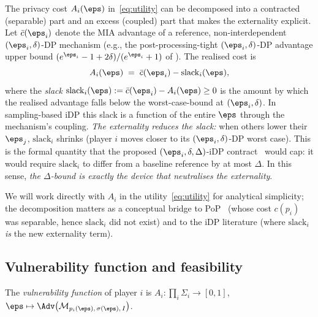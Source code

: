 The privacy cost $A_i(\boldsymbol{\eps})$ in~\eqref{eq:utility} can be
decomposed into a contracted (separable) part and an excess (coupled) part
that makes the externality explicit. Let $\bar c(\eps_i)$ denote the
MIA advantage of a reference, non-interdependent $(\eps_i, \delta)$-DP
mechanism (e.g., the post-processing-tight $(\eps_i,\delta)$-DP advantage
upper bound $(e^{\eps_i}-1+2\delta)/(e^{\eps_i}+1)$ of
\cite{hayes2024bullseye, kaissis2024beyond}). The realised cost is
\begin{equation}
A_i(\boldsymbol{\eps}) \;=\; \bar c(\eps_i) - \mathrm{slack}_i(\boldsymbol{\eps}),
\label{eq:decomp}
\end{equation}
where the \emph{slack} $\mathrm{slack}_i(\boldsymbol{\eps}) := \bar c(\eps_i)
- A_i(\boldsymbol{\eps}) \geq 0$ is the amount by which the realised
advantage falls below the worst-case-bound at $(\eps_i, \delta)$. In
sampling-based iDP this slack is a function of the entire $\boldsymbol{\eps}$
through the mechanism's coupling. \emph{The externality reduces the slack:}
when others lower their $\eps_j$, $\mathrm{slack}_i$ shrinks (player $i$
moves closer to its $(\eps_i, \delta)$-DP worst case). This is the formal
quantity that the proposed $(\eps_i, \delta, \Delta)$-iDP
contract~\cite{kaiser2026your, kaissis2024beyond} would cap: it would
require $\mathrm{slack}_i$ to differ from a baseline reference by at most
$\Delta$. In this sense, \emph{the $\Delta$-bound is exactly the device that
neutralises the externality}.

We will work directly with $A_i$ in the utility~\eqref{eq:utility} for
analytical simplicity; the decomposition matters as a conceptual bridge to
PoP~\cite{pejo2019together} (whose cost $c(p_i)$ was separable, hence
$\mathrm{slack}_i$ did not exist) and to the iDP literature
\cite{kaiser2026your} (where $\mathrm{slack}_i$ \emph{is} the new
externality term).

\subsection{Vulnerability function and feasibility}

\begin{definition}
\label{def:vulnerability}
The \emph{vulnerability function} of player $i$ is $A_i\colon
\prod_i\Sigma_i \to [0, 1]$, $\boldsymbol{\eps} \mapsto
\Adv\bigl(\mathcal{M}_{p_i(\boldsymbol{\eps}),\,\sigma(\boldsymbol{\eps}),\,I}\bigr)$.
\end{definition}

